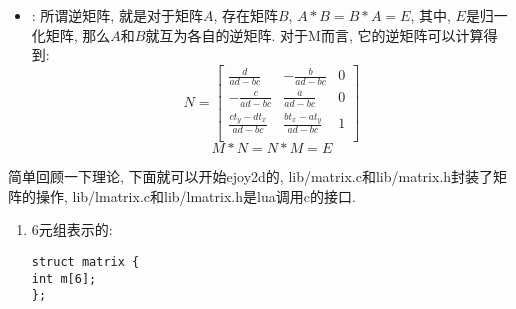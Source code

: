 {\begin {itemize}
    \item {
        {}: 所谓逆矩阵, 就是对于矩阵$A$, 存在矩阵$B$, $A * B = B * A = E$, 其中, $E$是归一化矩阵, 那么$A$和$B$就互为各自的逆矩阵. 对于M而言, 它的逆矩阵可以计算得到:
        \begin{equation}\label{inverse}
            N =
            \begin{bmatrix}
                \frac{d}{ad - bc}           &   -\frac{b}{ad - bc}          &   0\\
                -\frac{c}{ad - bc}          &   \frac{a}{ad-bc}             &   0\\
                \frac{ct_y - dt_x}{ad - bc} &  \frac{bt_x - at_y}{ad - bc}  &   1\\
            \end{bmatrix}
        \end{equation}
        \begin{equation}
            M * N = N * M = E
        \end{equation}
    }
    \end {itemize}

    \gaccobsplit

    { 简单回顾一下理论, 下面就可以开始ejoy2d的{}, lib/matrix.c和lib/matrix.h封装了矩阵的操作, lib/lmatrix.c和lib/lmatrix.h是lua调用c的接口.}

    \begin {enumerate}

    \gaccobsplitinv

    \item { 6元组表示的{}:
        \begin{lstlisting}[language={[ANSI]C}]
struct matrix {
int m[6];
};
        \end{lstlisting}
    }

    \gaccobsplitinv


\end{enumerate}}
